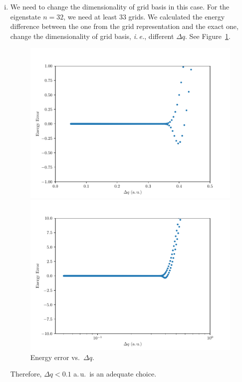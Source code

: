 \documentclass{article}
\newcommand{\ie}{\emph{i.\,e.}}
\begin{document}
\begin{enumerate}[1.]
\begin{enumerate}[(A)]
\begin{enumerate}[(i)]
      \item We need to change the dimensionality of grid basis in this case. For the eigenstate $n=32$, we need at least $33$ grids.
      We calculated the energy difference between the one from the grid representation and the exact one, change the dimensionality of grid basis, \ie, different $\Delta q$.
      See Figure~\ref{fig:q6b-3}.
      \begin{figure}[H]
        \centering
        \begin{minipage}{0.45\linewidth}
          \centering
          \includegraphics[width=\linewidth]{q6b-3.pdf}
        \end{minipage}
        \begin{minipage}{0.45\linewidth}
          \centering
          \includegraphics[width=\linewidth]{q6b-3l.pdf}
        \end{minipage}
        \caption{Energy error vs.\ $\Delta q$.}
        \label{fig:q6b-3}
      \end{figure}
      Therefore, $\Delta q < 0.1$ a.\,u.\ is an adequate choice.
      

\end{enumerate}
\end{enumerate}
\end{enumerate}
\end{document}
